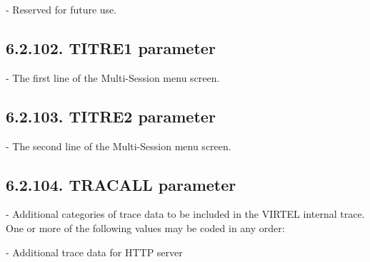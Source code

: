 \documentclass[letterpaper,10pt,english]{sphinxmanual}
\begin{document}
 - Reserved for future use.


\subsection{6.2.102. TITRE1 parameter}
\label{\detokenize{Installation_Guide:titre1-parameter}}
\begin{sphinxVerbatim}[commandchars=\\\{\}]
 
\end{sphinxVerbatim}

 - The first line of the Multi-Session menu screen.


\subsection{6.2.103. TITRE2 parameter}
\label{\detokenize{Installation_Guide:titre2-parameter}}
\begin{sphinxVerbatim}[commandchars=\\\{\}]
 
\end{sphinxVerbatim}

 - The second line of the Multi-Session menu screen.


\subsection{6.2.104. TRACALL parameter}
\label{\detokenize{Installation_Guide:tracall-parameter}}
\begin{sphinxVerbatim}[commandchars=\\\{\}]
 
\end{sphinxVerbatim}

 - Additional categories of trace data to be included in the VIRTEL internal trace. One or more of the following values may be coded in any order:

 - Additional trace data for HTTP server
\end{document}
